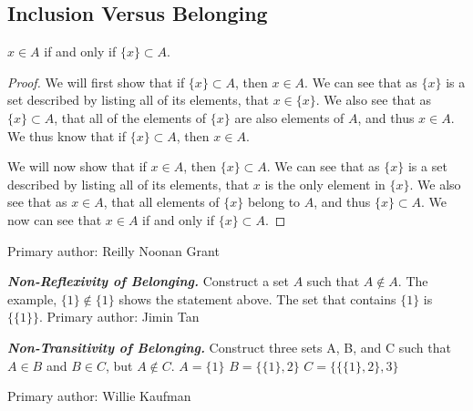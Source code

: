\subsection{Inclusion Versus Belonging}%
            \begin{majorEx}%
            $x \in A$ if and only if $\{x\} \subset A$.
            \end{majorEx}

\begin{proof} We will first show that if $\{x\} \subset A$, then $x \in A$. We can see that as $\{x\}$ is a set described by listing all of its elements, that $x \in \{x\}$. We also see that
as $\{x\} \subset A$, that all of the elements of $\{x\}$ are also elements of $A$, and thus $x \in A$. We thus know that if $\{x\} \subset A$, then $x \in A$.

We will now show that if $x \in A$, then $\{x\} \subset A$. We can see that as $\{x\}$ is a set described by listing all of its elements, that $x$ is the only element in $\{x\}$.
We also see that as $x \in A$, that all elements of $\{ x\}$ belong to $A$, and thus $\{x\} \subset A$. We now can see that $x \in A$ if and only if $\{x\} \subset A$.
\end{proof}
Primary author: Reilly Noonan Grant			
            \begin{majorEx}%
            \textbf{\textit{Non-Reflexivity of Belonging.}} Construct a set $A$ such that $A \not\in A$.
            The example, $\{1\} \not\in \{1\}$ shows the statement above. The set that contains $\{1\}$ is $\{\{1\}\}$.
                    Primary author: Jimin Tan            
                    \end{majorEx}
            
\begin{majorEx}%
            \textbf{\textit{Non-Transitivity of Belonging.}} Construct three sets A, B, and C such that $A \in B$ and $B \in C$, but $A \not \in C$.
            \newline $A = \{1\}$
            \newline $B = \{\{1\}, 2\}$
            \newline $C = \{\{\{1\}, 2\}, 3\}$
            \newline
            \end{majorEx}
            
Primary author: Willie Kaufman
